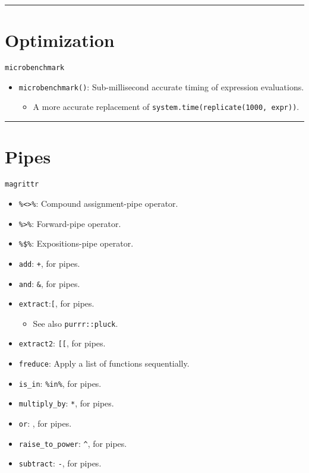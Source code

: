 \documentclass[
]{book}
\providecommand{\tightlist}{%
  \setlength{\itemsep}{0pt}\setlength{\parskip}{0pt}}
\begin{document}
\begin{center}\rule{0.5\linewidth}{0.5pt}\end{center}

\hypertarget{optimization}{%
\section{Optimization}\label{optimization}}

\texttt{microbenchmark}

\begin{itemize}
\tightlist
\item
  \texttt{microbenchmark()}: Sub-millisecond accurate timing of expression evaluations.

  \begin{itemize}
  \tightlist
  \item
    A more accurate replacement of \texttt{system.time(replicate(1000,\ expr))}.
  \end{itemize}
\end{itemize}

\begin{center}\rule{0.5\linewidth}{0.5pt}\end{center}

\hypertarget{pipes}{%
\section{Pipes}\label{pipes}}

\texttt{magrittr}

\begin{itemize}
\tightlist
\item
  \texttt{\%\textless{}\textgreater{}\%}: Compound assignment-pipe operator.
\item
  \texttt{\%\textgreater{}\%}: Forward-pipe operator.
\item
  \texttt{\%\$\%}: Expositions-pipe operator.
\item
  \texttt{add}: \texttt{+}, for pipes.
\item
  \texttt{and}: \texttt{\&}, for pipes.
\item
  \texttt{extract}:\texttt{{[}}, for pipes.

  \begin{itemize}
  \tightlist
  \item
    See also \texttt{purrr::pluck}.
  \end{itemize}
\item
  \texttt{extract2}: \texttt{{[}{[}}, for pipes.
\item
  \texttt{freduce}: Apply a list of functions sequentially.
\item
  \texttt{is\_in}: \texttt{\%in\%}, for pipes.
\item
  \texttt{multiply\_by}: \texttt{*}, for pipes.
\item
  \texttt{or}: \texttt{\textbar{}}, for pipes.
\item
  \texttt{raise\_to\_power}: \texttt{\^{}}, for pipes.
\item
  \texttt{subtract}: \texttt{-}, for pipes.
\end{itemize}
\end{document}
